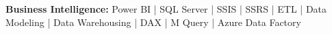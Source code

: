 \textbf{Business Intelligence:} Power BI | SQL Server | SSIS | SSRS | ETL | Data Modeling | Data Warehousing | DAX | M Query | Azure Data Factory